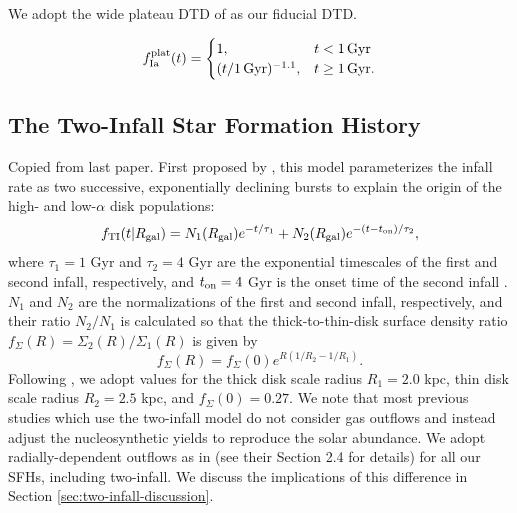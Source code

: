 \documentclass[twocolumn,twocolappendix,linenumbers]{aastex631}
\newcommand{\todo}[1]{{\color{red}#1}}
\begin{document}
We adopt the wide plateau DTD of \citet{dubay_galactic_2024} as our fiducial DTD.

\begin{equation}
    \label{eq:plateau-dtd}
    f_{\rm Ia}^{\rm plat}(t) =
    \begin{cases}
        1, & t < 1\,{\rm Gyr} \\
        (t/1\,{\rm Gyr})^{-1.1}, & t \ge 1\,{\rm Gyr}.
    \end{cases}
\end{equation}

\subsection{The Two-Infall Star Formation History}
\label{sec:sfh}

\todo{Copied from last paper.} First proposed by \citet{chiappini_chemical_1997}, this model parameterizes the infall rate as two successive, exponentially declining bursts to explain the origin of the high- and low-$\alpha$ disk populations:
\begin{equation}
    \label{eq:twoinfall-ifr}
    f_{\rm TI}(t|R_{\rm gal}) = N_1(R_{\rm gal}) e^{-t/\tau_1} + N_2(R_{\rm gal}) e^{-(t-t_{\rm on})/\tau_2},
\end{equation}
where $\tau_1=1$ Gyr and $\tau_2=4$ Gyr are the exponential timescales of the first and second infall, respectively, and $t_{\rm on}=4$ Gyr is the onset time of the second infall \citep[based on typical values in, e.g.,][]{chiappini_chemical_1997,spitoni_galactic_2020,spitoni_apogee_2021}. $N_1$ and $N_2$ are the normalizations of the first and second infall, respectively, and their ratio $N_2/N_1$ is calculated so that the thick-to-thin-disk surface density ratio $f_\Sigma(R)=\Sigma_2(R)/\Sigma_1(R)$ is given by
\begin{equation}
    f_\Sigma(R) = f_\Sigma(0) e^{R(1/R_2 - 1/R_1)}.
\end{equation}
Following \citet{bland-hawthorn_galaxy_2016}, we adopt values for the thick disk scale radius $R_1=2.0$ kpc, thin disk scale radius $R_2=2.5$ kpc, and $f_\Sigma(0)=0.27$.
We note that most previous studies which use the two-infall model \citep[e.g.][]{chiappini_chemical_1997,matteucci_new_2006,matteucci_effect_2009,spitoni_galactic_2019} do not consider gas outflows and instead adjust the nucleosynthetic yields to reproduce the solar abundance. We adopt radially-dependent outflows as in  (see their Section 2.4 for details) for all our SFHs, including two-infall. We discuss the implications of this difference in Section \ref{sec:two-infall-discussion}.
\end{document}
